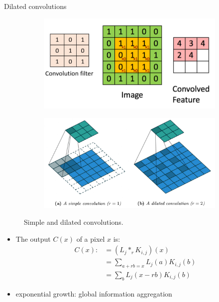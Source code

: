 \documentclass[9pt]{beamer}
\begin{document}
\begin{frame}{Dilated convolutions}
\begin{figure}
    \begin{subfigure}{.4\linewidth}
        \centering
        \includegraphics[width=\linewidth]{pics/conv1.PNG}
    \end{subfigure}
    \hspace{5mm}
    \begin{subfigure}{.5\linewidth}
        \centering
        \includegraphics[width=\linewidth]{pics/dilated.png}
    \end{subfigure}
\caption{Simple and dilated convolutions.}
\end{figure}

\begin{itemize}
\item The output $C(x)$ of a pixel $x$ is:
    \begin{align*}
    C(x):& = (L_j*_r K_{i,j})(x) \\
         & = \sum_{a+rb=x}L_j(a)K_{i,j}(b) \\
         & = \sum_b L_j(x-rb)K_{i,j}(b)
    \end{align*}
\item exponential growth: global information aggregation
\end{itemize}
\end{frame}
\end{document}
